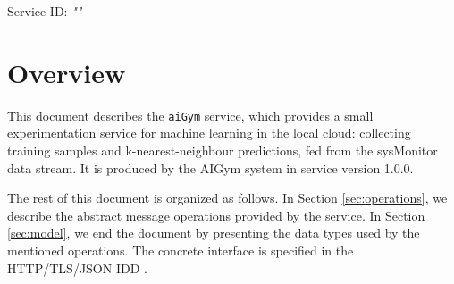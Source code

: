 \documentclass[a4paper]{arrowhead}
\begin{document}
\sloppy

\ArrowheadSetup

\begin{center}
  \vspace*{1cm}
  \huge{\arrowtitle}

  \vspace*{0.2cm}
  \LARGE{\arrowtype}
  \vspace*{1cm}

  \Large{Service ID: \textit{"\arrowid"}}

  \vspace*{\fill}


  \vspace*{1cm}
  \vspace*{\fill}

  \begin{abstract}
    This document describes the \texttt{aiGym} service, version 1.0.0, produced by the AIGym support system of Arrowhead 5.2.2.
  \end{abstract}

  \vspace*{1cm}
\end{center}

\newpage

\tableofcontents
\newpage

\section{Overview}
\label{sec:overview}

This document describes the \texttt{aiGym} service, which provides a small experimentation service for machine learning in the local cloud: collecting training samples and k-nearest-neighbour predictions, fed from the sysMonitor data stream.
It is produced by the AIGym system \cite{aig-sysd} in service version 1.0.0.

The rest of this document is organized as follows.
In Section \ref{sec:operations}, we describe the abstract message operations provided by the service.
In Section \ref{sec:model}, we end the document by presenting the data types used by the mentioned operations.
The concrete interface is specified in the HTTP/TLS/JSON IDD \cite{aig-aiGym-http-idd}.
\end{document}
